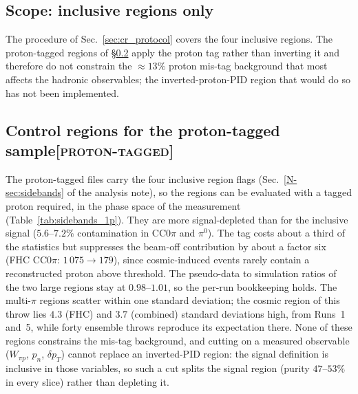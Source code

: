 \documentclass[11pt,a4paper]{article}
\newcommand{\noteref}[2]{#1~\ref{N-#2} of the analysis note}
\newcommand{\scopetag}[1]{\hfill{\normalfont\small\textsc{[#1]}}}
\begin{document}
\subsection{Scope: inclusive regions only}
\label{sec:cr_1p_scope}
The procedure of Sec.~\ref{sec:cr_protocol} covers the four inclusive regions. The proton-tagged regions of
\S\ref{sec:sidebands_1p} apply the proton tag rather than inverting it and therefore do not constrain the
$\approx\!13\%$ proton mis-tag background that most affects the hadronic observables; the
inverted-proton-PID region that would do so has not been implemented.

\subsection[Control regions for the proton-tagged sample]{Control regions for the proton-tagged sample\scopetag{proton-tagged}}
\label{sec:sidebands_1p}

The proton-tagged files carry the four inclusive region flags (\noteref{Sec.}{sec:sidebands}), so the
regions can be evaluated with a tagged proton required, in the phase space of the measurement
(Table~\ref{tab:sidebands_1p}). They are more signal-depleted than for the inclusive signal ($5.6$--$7.2\%$
contamination in CC$0\pi$ and $\pi^0$). The tag costs about a third of the statistics but suppresses the
beam-off contribution by about a factor six (FHC CC$0\pi$: $1\,075\to179$), since cosmic-induced events
rarely contain a reconstructed proton above threshold. The pseudo-data to simulation ratios of the two
large regions stay at $0.98$--$1.01$, so the per-run bookkeeping holds. The multi-$\pi$ regions scatter
within one standard deviation; the cosmic region of this throw lies $4.3$ (FHC) and $3.7$ (combined)
standard deviations high, from Runs~1 and~5, while forty ensemble throws reproduce its expectation there. None of these regions constrains the mis-tag
background, and cutting on a measured observable ($W_{\pi p}$, $p_n$, $\delta p_T$) cannot replace an
inverted-PID region: the signal definition is inclusive in those variables, so such a cut splits the
signal region (purity $47$--$53\%$ in every slice) rather than depleting it.
\end{document}
